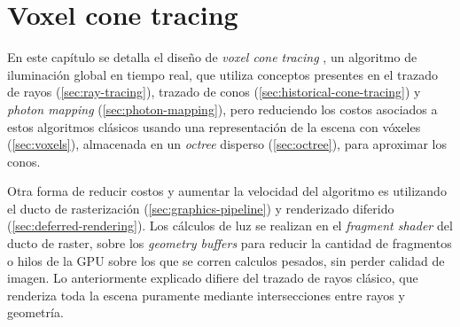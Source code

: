 


\graphicspath{{chapters/3_diseño/figures/}}

\chapter{Voxel cone tracing}\label{chap:design}

En este capítulo se detalla el diseño de \textit{voxel cone tracing} \cite{voxel-cone-tracing}, un algoritmo de iluminación global en tiempo real, que utiliza conceptos presentes en el trazado de rayos (\ref{sec:ray-tracing}), trazado de conos (\ref{sec:historical-cone-tracing}) y \textit{photon mapping} (\ref{sec:photon-mapping}), 
pero reduciendo los costos asociados a estos algoritmos clásicos usando una representación de la escena con vóxeles (\ref{sec:voxels}), almacenada en un \textit{octree} disperso (\ref{sec:octree}), para aproximar los conos.

Otra forma de reducir costos y aumentar la velocidad del algoritmo es utilizando el ducto de rasterización (\ref{sec:graphics-pipeline}) y renderizado diferido (\ref{sec:deferred-rendering}).
Los cálculos de luz se realizan en el \textit{fragment shader} del ducto de raster, sobre los \textit{geometry buffers} para reducir la cantidad de fragmentos o hilos de la GPU sobre los que se corren calculos pesados, sin perder calidad de imagen.
Lo anteriormente explicado difiere del trazado de rayos clásico, que renderiza toda la escena puramente mediante intersecciones entre rayos y geometría.

